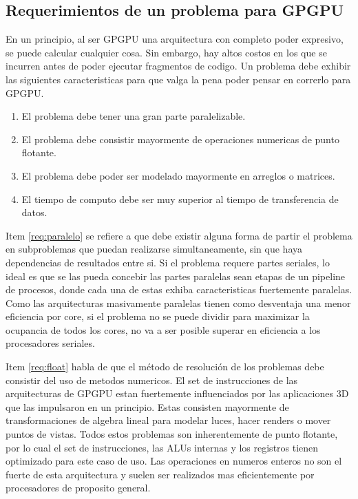 \subsection{Requerimientos de un problema para GPGPU}
En un principio, al ser GPGPU una arquitectura con completo poder expresivo, se puede
calcular cualquier cosa. Sin embargo, hay altos costos en los que se incurren antes de
poder ejecutar fragmentos de codigo. Un problema debe exhibir las siguientes caracteristicas
para que valga la pena poder pensar en correrlo para GPGPU.
\begin{enumerate}
  \item \label{req:paralelo} El problema debe tener una gran parte paralelizable.
  \item \label{req:float} El problema debe consistir mayormente de operaciones numericas de punto flotante.
  \item \label{req:matrix} El problema debe poder ser modelado mayormente en arreglos o matrices.
  \item \label{req:transf} El tiempo de computo debe ser muy superior al tiempo de transferencia de datos.
\end{enumerate}

Item \ref{req:paralelo} se refiere a que debe existir alguna forma de partir el problema
en subproblemas que puedan realizarse simultaneamente, sin que haya dependencias de
resultados entre si. Si el problema requere partes seriales, lo ideal es que se las
pueda concebir las partes paralelas sean etapas de un pipeline de procesos, donde
cada una de estas exhiba caracteristicas fuertemente paralelas. Como las arquitecturas
masivamente paralelas tienen como desventaja una menor eficiencia por core, si el
problema no se puede dividir para maximizar la ocupancia de todos los cores, no
va a ser posible superar en eficiencia a los procesadores seriales.

Item \ref{req:float} habla de que el m\'etodo de resoluci\'on de los problemas debe
consistir del uso de metodos numericos. El set de instrucciones de las arquitecturas
de GPGPU estan fuertemente influenciados por las aplicaciones 3D que las impulsaron
en un principio. Estas consisten mayormente de transformaciones de algebra lineal
para modelar luces, hacer renders o mover puntos de vistas. Todos estos problemas
son inherentemente de punto flotante, por lo cual el set de instrucciones, las ALUs
internas y los registros tienen optimizado para este caso de uso. Las operaciones
en numeros enteros no son el fuerte de esta arquitectura y suelen ser realizados
mas eficientemente por procesadores de proposito general.

